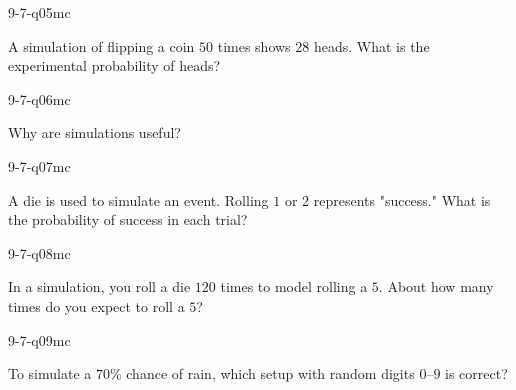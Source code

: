 \begin{practiceQuestion}{9-7-q05}{mc}
\begin{questionText}
A simulation of flipping a coin $50$ times shows $28$ heads. What is the experimental probability of heads?
\end{questionText}
\end{practiceQuestion}

\begin{practiceQuestion}{9-7-q06}{mc}
\begin{questionText}
Why are simulations useful?
\end{questionText}
\end{practiceQuestion}

\begin{practiceQuestion}{9-7-q07}{mc}
\begin{questionText}
A die is used to simulate an event. Rolling $1$ or $2$ represents "success." What is the probability of success in each trial?
\end{questionText}
\end{practiceQuestion}

\begin{practiceQuestion}{9-7-q08}{mc}
\begin{questionText}
In a simulation, you roll a die $120$ times to model rolling a $5$. About how many times do you expect to roll a $5$?
\end{questionText}
\end{practiceQuestion}

\begin{practiceQuestion}{9-7-q09}{mc}
\begin{questionText}
To simulate a $70\%$ chance of rain, which setup with random digits $0$--$9$ is correct?
\end{questionText}
\end{practiceQuestion}

